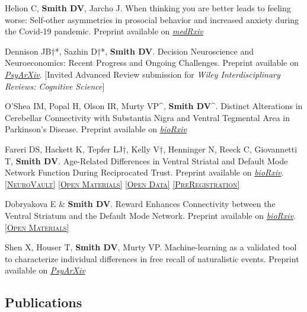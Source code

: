 \documentclass[11pt, letterpaper]{article}
\newcommand{\psyarxiv}[1]{\href{#1}{\textit{PsyArXiv}}}
\newcommand{\biorxiv}[1]{\href{#1}{\textit{bioRxiv}}}
\newcommand{\medrxiv}[1]{\href{#1}{\textit{medRxiv}}}
\newcommand{\neurovault}[1]{\href{#1}{\scriptsize\textsc{[NeuroVault]}}}
\newcommand{\materials}[1]{\href{#1}{\scriptsize\textsc{[Open Materials]}}}
\newcommand{\data}[1]{\href{#1}{\scriptsize\textsc{[Open Data]}}}
\newcommand{\preregistration}[1]{\href{#1}{\scriptsize\textsc{[PreRegistration]}}}
\begin{document}
\begin{hangparas}{.5in}{1}

Helion C, \textbf{Smith DV}, Jarcho J. When thinking you are better leads to feeling worse: Self-other asymmetries in prosocial behavior and increased anxiety during the Covid-19 pandemic. Preprint available on \medrxiv{https://doi.org/10.1101/2021.02.26.21252547}

Dennison JB†*, Sazhin D†*, \textbf{Smith DV}. Decision Neuroscience and Neuroeconomics: Recent Progress and Ongoing Challenges. Preprint available on \psyarxiv{https://doi.org/10.31234/osf.io/4v2re}. [Invited Advanced Review submission for \textit{Wiley Interdisciplinary Reviews: Cognitive Science}] 

O'Shea IM, Popal H, Olson IR, Murty VP\^{}, \textbf{Smith DV}\^{}. Distinct Alterations in Cerebellar Connectivity with Substantia Nigra and Ventral Tegmental Area in Parkinson's Disease. Preprint available on \biorxiv{https://doi.org/10.1101/2021.05.13.443998}

Fareri DS, Hackett K, Tepfer LJ†, Kelly V†, Henninger N, Reeck C, Giovannetti T, \textbf{Smith DV}. Age-Related Differences in Ventral Striatal and Default Mode Network Function During Reciprocated Trust. Preprint available on \biorxiv{https://doi.org/10.1101/2021.07.29.454071}. \neurovault{https://identifiers.org/neurovault.collection:10447} \materials{https://github.com/DVS-Lab/srndna-trustgame} \data{https://openneuro.org/datasets/ds003745} \preregistration{https://aspredicted.org/MVZ_ODI}

Dobryakova E \& \textbf{Smith DV}. Reward Enhances Connectivity between the Ventral Striatum and the Default Mode Network. Preprint available on \biorxiv{https://doi.org/10.1101/2021.07.28.454086}. \materials{https://github.com/edobryakova/DobryakovaSmith_HCP}

Shen X, Houser T, \textbf{Smith DV}, Murty VP. Machine-learning as a validated tool to characterize individual differences in free recall of naturalistic events. Preprint available on \psyarxiv{https://doi.org/10.31234/osf.io/uygzv} \\



\end{hangparas}


\subsection*{Publications}
\end{document}

